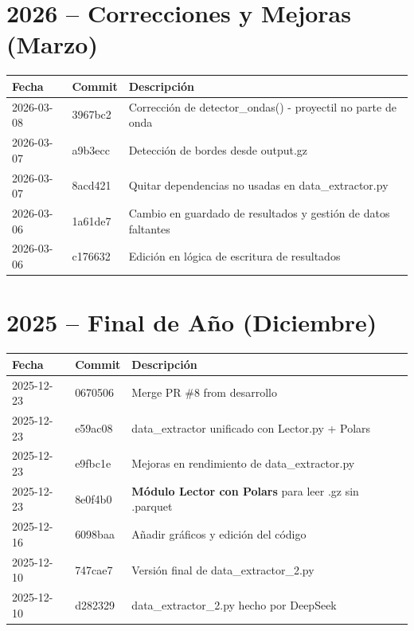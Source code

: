 \documentclass[12pt,a4paper]{article}
\begin{document}
\section*{2026 -- Correcciones y Mejoras (Marzo)}

\begin{longtable}{@{}llp{10cm}@{}}
	\toprule
	\textbf{Fecha} & \textbf{Commit} & \textbf{Descripción}                                          \\
	\midrule
	2026-03-08     & 3967bc2         & Corrección de detector\_ondas() - proyectil no parte de onda  \\
	2026-03-07     & a9b3ecc         & Detección de bordes desde output.gz                           \\
	2026-03-07     & 8acd421         & Quitar dependencias no usadas en data\_extractor.py           \\
	2026-03-06     & 1a61de7         & Cambio en guardado de resultados y gestión de datos faltantes \\
	2026-03-06     & c176632         & Edición en lógica de escritura de resultados                  \\
	\bottomrule
\end{longtable}

\section*{2025 -- Final de Año (Diciembre)}

\begin{longtable}{@{}llp{10cm}@{}}
	\toprule
	\textbf{Fecha} & \textbf{Commit} & \textbf{Descripción}                                         \\
	\midrule
	2025-12-23     & 0670506         & Merge PR \#8 from desarrollo                                 \\
	2025-12-23     & e59ac08         & data\_extractor unificado con Lector.py + Polars             \\
	2025-12-23     & e9fbc1e         & Mejoras en rendimiento de data\_extractor.py                 \\
	2025-12-23     & 8e0f4b0         & \textbf{Módulo Lector con Polars} para leer .gz sin .parquet \\
	2025-12-16     & 6098baa         & Añadir gráficos y edición del código                         \\
	2025-12-10     & 747cae7         & Versión final de data\_extractor\_2.py                       \\
	2025-12-10     & d282329         & data\_extractor\_2.py hecho por DeepSeek                     \\
	\bottomrule
\end{longtable}
\end{document}
